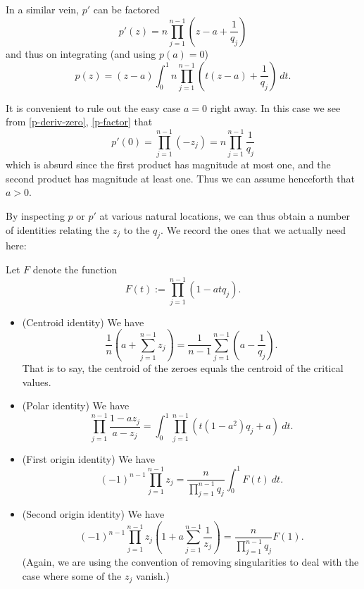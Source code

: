 \documentclass[12pt]{article}
\begin{document}
In a similar vein, $p'$ can be factored 
\begin{equation}\label{p-factor}
    p'(z) = n \prod_{j=1}^{n-1} (z - a + \frac{1}{q_j})
\end{equation}
and thus on integrating (and using $p(a)=0$)
\begin{equation}\label{p-integral}
    p(z) = (z-a) \int_0^1 n \prod_{j=1}^{n-1} (t(z - a) + \frac{1}{q_j})\ dt.
\end{equation}

It is convenient to rule out the easy case $a=0$ right away.  In this case we see from \eqref{p-deriv-zero}, \eqref{p-factor} that
$$ p'(0) = \prod_{j=1}^{n-1} (-z_j) = n \prod_{j=1}^{n-1} \frac{1}{q_j}$$
which is absurd since the first product has magnitude at most one, and the second product has magnitude at least one.  Thus we can assume henceforth that $a>0$.

By inspecting $p$ or $p'$ at various natural locations, we can thus obtain a number of identities relating the $z_j$ to the $q_j$.  We record the ones that we actually need here:

\begin{lemma}\label{identities}  Let $F$ denote the function
\begin{equation}\label{F-def} F(t) := \prod_{j=1}^{n-1} (1 - atq_j).
\end{equation}
\begin{itemize}
    \item [(i)] (Centroid identity)  We have
    $$ \frac{1}{n} (a + \sum_{j=1}^{n-1} z_j) = \frac{1}{n-1} \sum_{j=1}^{n-1} (a - \frac{1}{q_j}).$$
    That is to say, the centroid of the zeroes equals the centroid of the critical values.
    \item [(ii)]  (Polar identity)  We have
    $$ \prod_{j=1}^{n-1} \frac{1-az_j}{a-z_j} = \int_0^1 \prod_{j=1}^{n-1} (t (1-a^2) q_j + a)\ dt.$$
    \item [(iii)]  (First origin identity) We have
\begin{equation}\label{first-origin} 
    (-1)^{n-1} \prod_{j=1}^{n-1} z_j = \frac{n}{\prod_{j=1}^{n-1} q_j} \int_0^1 F(t)\ dt.
\end{equation}
 \item [(iv)]  (Second origin identity) We have
    $$ (-1)^{n-1} \prod_{j=1}^{n-1} z_j \left( 1 + a \sum_{j=1}^{n-1} \frac{1}{z_j} \right) = \frac{n}{\prod_{j=1}^{n-1} q_j} F(1).$$ 
    (Again, we are using the convention of removing singularities to deal with the case where some of the $z_j$ vanish.)
\end{itemize}
\end{lemma}
\end{document}
